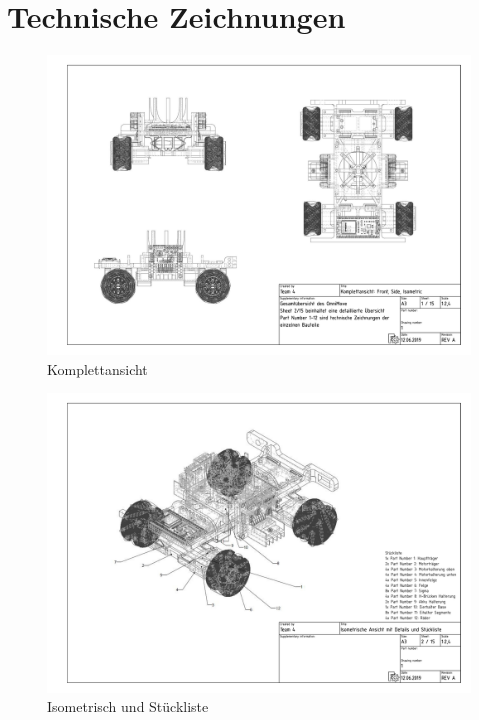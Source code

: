 \chapter{Technische Zeichnungen}

\begin{figure}[ht!]
	\includegraphics[width=\textwidth]{../techzeich/00.PDF} 	
	\caption{Komplettansicht}
\end{figure}

\begin{figure}[ht!]
	\includegraphics[width=\textwidth]{../techzeich/01.PDF} 
	\caption{Isometrisch und Stückliste}
\end{figure}

